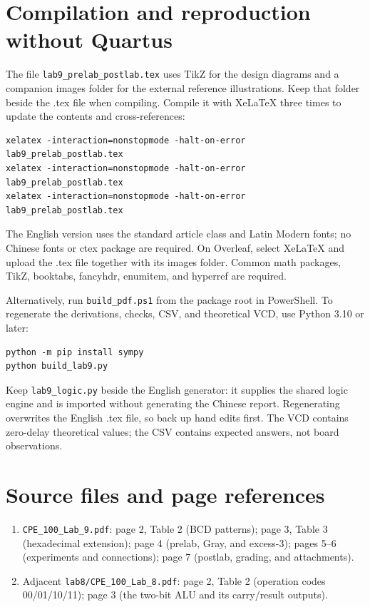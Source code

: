 \documentclass[a4paper,11pt]{article}
\begin{document}
\appendix
\clearpage\section{Compilation and reproduction without Quartus}
The file \texttt{lab9\_prelab\_postlab.tex} uses TikZ for the design diagrams and a companion images folder for the external reference illustrations. Keep that folder beside the .tex file when compiling. Compile it with XeLaTeX three times to update
the contents and cross-references:
\begin{verbatim}
xelatex -interaction=nonstopmode -halt-on-error lab9_prelab_postlab.tex
xelatex -interaction=nonstopmode -halt-on-error lab9_prelab_postlab.tex
xelatex -interaction=nonstopmode -halt-on-error lab9_prelab_postlab.tex
\end{verbatim}
The English version uses the standard article class and Latin Modern fonts; no Chinese
fonts or ctex package are required. On Overleaf, select XeLaTeX and upload the .tex file together with its images folder.
Common math packages, TikZ, booktabs, fancyhdr, enumitem, and hyperref are required.

Alternatively, run \texttt{build\_pdf.ps1} from the package root in PowerShell.
To regenerate the derivations, checks, CSV, and theoretical VCD, use Python 3.10 or later:
\begin{verbatim}
python -m pip install sympy
python build_lab9.py
\end{verbatim}
Keep \texttt{lab9\_logic.py} beside the English generator: it supplies the shared logic
engine and is imported without generating the Chinese report. Regenerating overwrites
the English .tex file, so back up hand edits first. The VCD contains zero-delay theoretical
values; the CSV contains expected answers, not board observations.

\section{Source files and page references}
\begin{enumerate}
\item \texttt{CPE\_100\_Lab\_9.pdf}: page 2, Table 2 (BCD patterns); page 3,
Table 3 (hexadecimal extension); page 4 (prelab, Gray, and excess-3); pages 5--6
(experiments and connections); page 7 (postlab, grading, and attachments).
\item Adjacent \texttt{lab8/CPE\_100\_Lab\_8.pdf}: page 2, Table 2 (operation codes
00/01/10/11); page 3 (the two-bit ALU and its carry/result outputs).
\end{enumerate}
\end{document}
